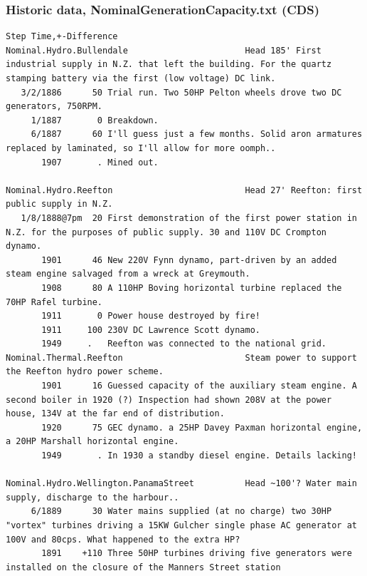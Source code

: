 \documentclass[aspectratio=169]{beamer}
\begin{document}
\begin{frame}[fragile]
  \frametitle{Historic data, NominalGenerationCapacity.txt (CDS)}
  \scriptsize
  \begin{verbatim}
Step Time,+-Difference
Nominal.Hydro.Bullendale                       Head 185' First industrial supply in N.Z. that left the building. For the quartz stamping battery via the first (low voltage) DC link.
   3/2/1886      50 Trial run. Two 50HP Pelton wheels drove two DC generators, 750RPM.
     1/1887       0 Breakdown.
     6/1887      60 I'll guess just a few months. Solid aron armatures replaced by laminated, so I'll allow for more oomph..
       1907       . Mined out.

Nominal.Hydro.Reefton                          Head 27' Reefton: first public supply in N.Z.
   1/8/1888@7pm  20 First demonstration of the first power station in N.Z. for the purposes of public supply. 30 and 110V DC Crompton dynamo.
       1901      46 New 220V Fynn dynamo, part-driven by an added steam engine salvaged from a wreck at Greymouth.
       1908      80 A 110HP Boving horizontal turbine replaced the 70HP Rafel turbine.
       1911       0 Power house destroyed by fire!
       1911     100 230V DC Lawrence Scott dynamo.
       1949     .   Reefton was connected to the national grid.
Nominal.Thermal.Reefton                        Steam power to support the Reefton hydro power scheme.
       1901      16 Guessed capacity of the auxiliary steam engine. A second boiler in 1920 (?) Inspection had shown 208V at the power house, 134V at the far end of distribution.
       1920      75 GEC dynamo. a 25HP Davey Paxman horizontal engine, a 20HP Marshall horizontal engine.
       1949       . In 1930 a standby diesel engine. Details lacking!

Nominal.Hydro.Wellington.PanamaStreet          Head ~100'? Water main supply, discharge to the harbour..
     6/1889      30 Water mains supplied (at no charge) two 30HP "vortex" turbines driving a 15KW Gulcher single phase AC generator at 100V and 80cps. What happened to the extra HP?
       1891    +110 Three 50HP turbines driving five generators were installed on the closure of the Manners Street station

  \end{verbatim}
\end{frame}
\end{document}
